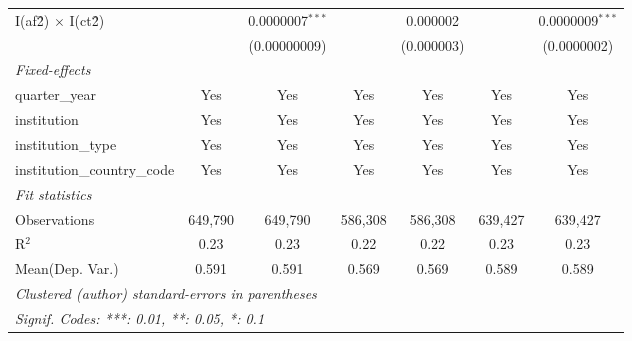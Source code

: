 \begin{tabular}{lcccccc}
   I(af\^2) $\times$ I(ct\^2)         &               & 0.0000007$^{***}$ &               & 0.000002        &               & 0.0000009$^{***}$\\   
                                      &               & (0.00000009)      &               & (0.000003)      &               & (0.0000002)\\   
   \midrule
   \emph{Fixed-effects}\\
   quarter\_year                      & Yes           & Yes               & Yes           & Yes             & Yes           & Yes\\  
   institution                        & Yes           & Yes               & Yes           & Yes             & Yes           & Yes\\  
   institution\_type                  & Yes           & Yes               & Yes           & Yes             & Yes           & Yes\\  
   institution\_country\_code         & Yes           & Yes               & Yes           & Yes             & Yes           & Yes\\  
   \midrule
   \emph{Fit statistics}\\
   Observations                       & 649,790       & 649,790           & 586,308       & 586,308         & 639,427       & 639,427\\  
   R$^2$                              & 0.23          & 0.23              & 0.22          & 0.22            & 0.23          & 0.23\\  
Mean(Dep. Var.) & 0.591 & 0.591 & 0.569 & 0.569 & 0.589 & 0.589 \\
   \midrule \midrule
   \multicolumn{7}{l}{\emph{Clustered (author) standard-errors in parentheses}}\\
   \multicolumn{7}{l}{\emph{Signif. Codes: ***: 0.01, **: 0.05, *: 0.1}}\\
\end{tabular}
\par\endgroup
